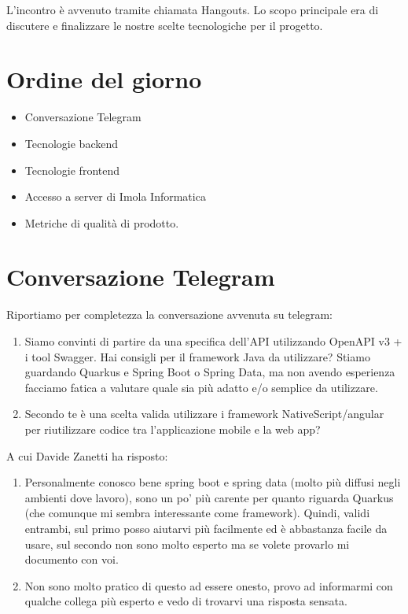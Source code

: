 \documentclass{article}
\begin{document}
L'incontro è avvenuto tramite chiamata Hangouts.
Lo scopo principale era di discutere e finalizzare le nostre scelte tecnologiche per il progetto.

\section{Ordine del giorno}%
\label{sec:ordine_del_giorno}

\begin{itemize}
  \item Conversazione Telegram
  \item Tecnologie backend
  \item Tecnologie frontend
  \item Accesso a server di Imola Informatica
  \item Metriche di qualità di prodotto.
\end{itemize}

\section{Conversazione Telegram}%
\label{sec:conversazione_telegram}

Riportiamo per completezza la conversazione avvenuta su telegram:

\begin{enumerate}
  \item Siamo convinti di partire da una specifica dell'API utilizzando OpenAPI v3 + i tool Swagger.
        Hai consigli per il framework Java da utilizzare? Stiamo guardando Quarkus e Spring Boot o Spring Data, ma non avendo esperienza facciamo fatica a valutare quale sia più adatto e/o semplice da utilizzare.
  \item Secondo te è una scelta valida utilizzare i framework NativeScript/angular per riutilizzare codice tra l'applicazione mobile e la web app?
\end{enumerate}

A cui Davide Zanetti ha risposto:

\begin{enumerate}
  \item Personalmente conosco bene spring boot e spring data (molto più diffusi negli ambienti dove lavoro), sono un po' più carente per quanto riguarda Quarkus (che comunque mi sembra interessante come framework).
        Quindi, validi entrambi, sul primo posso aiutarvi più facilmente ed è abbastanza facile da usare, sul secondo non sono molto esperto ma se volete provarlo mi documento con voi.
  \item Non sono molto pratico di questo ad essere onesto, provo ad informarmi con qualche collega più esperto e vedo di trovarvi una risposta sensata.
\end{enumerate}
\end{document}
